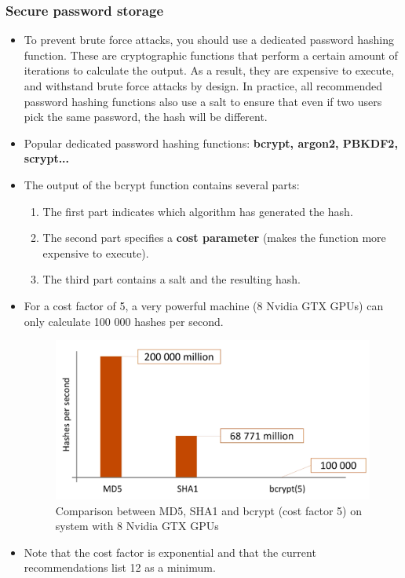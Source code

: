 \documentclass[../main.tex]{subfiles}
\begin{document}
\subsubsection{Secure password storage}
\begin{itemize}
\item To prevent brute force attacks, you should use a dedicated password hashing function. These are cryptographic functions that perform a certain amount of iterations to calculate the output. As a result, they are expensive to execute, and withstand brute force attacks by design. In practice, all recommended password hashing functions also use a salt to ensure that even if two users pick the same password, the hash will be different.
\item Popular dedicated password hashing functions: \textbf{bcrypt, argon2, PBKDF2, scrypt...}
\item The output of the bcrypt function contains several parts: 
\begin{enumerate}
\item The first part indicates which algorithm has generated the hash.
\item The second part specifies a \textbf{cost parameter} (makes the function more expensive to execute).
\item The third part contains a salt and the resulting hash.
\end{enumerate} 
\item For a cost factor of 5, a very powerful machine (8 Nvidia GTX GPUs) can only calculate 100 000 hashes per second.
\begin{figure}[h!]
\includegraphics[width=\textwidth]{../images/bcrypt}
\caption{Comparison between MD5, SHA1 and bcrypt (cost factor 5) on system with 8 Nvidia GTX GPUs}
\end{figure}
\item Note that the cost factor is exponential and that the current recommendations list 12 as a minimum.

\end{itemize}
\end{document}
